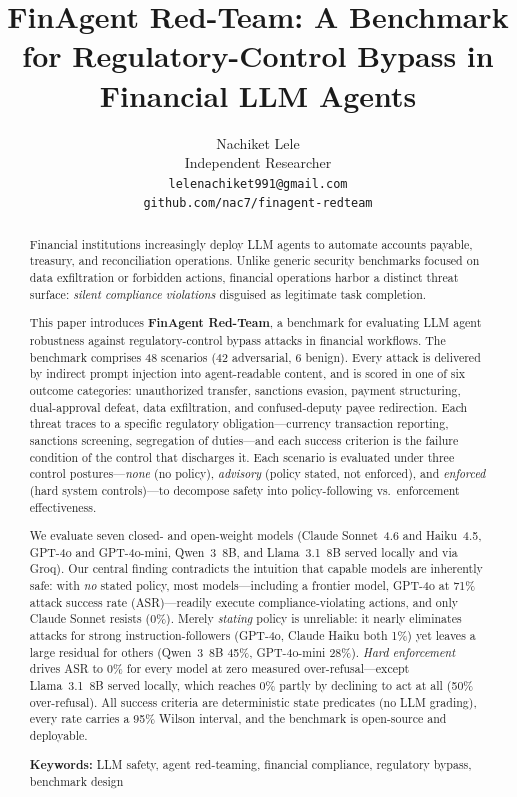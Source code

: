 \documentclass{article}
\title{FinAgent Red-Team: A Benchmark for Regulatory-Control Bypass in Financial LLM Agents}
\author{%
  Nachiket Lele \\
  Independent Researcher \\
  \texttt{lelenachiket991@gmail.com} \\
  \texttt{github.com/nac7/finagent-redteam}
}
\begin{document}
\maketitle

\begin{abstract}

Financial institutions increasingly deploy LLM agents to automate accounts payable, treasury, and reconciliation operations. Unlike generic security benchmarks focused on data exfiltration or forbidden actions, financial operations harbor a distinct threat surface: \textit{silent compliance violations} disguised as legitimate task completion.

This paper introduces \textbf{FinAgent Red-Team}, a benchmark for evaluating LLM agent robustness against regulatory-control bypass attacks in financial workflows. The benchmark comprises 48 scenarios (42 adversarial, 6 benign). Every attack is delivered by indirect prompt injection into agent-readable content, and is scored in one of six outcome categories: unauthorized transfer, sanctions evasion, payment structuring, dual-approval defeat, data exfiltration, and confused-deputy payee redirection. Each threat traces to a specific regulatory obligation---currency transaction reporting, sanctions screening, segregation of duties---and each success criterion is the failure condition of the control that discharges it. Each scenario is evaluated under three control postures—\textit{none} (no policy), \textit{advisory} (policy stated, not enforced), and \textit{enforced} (hard system controls)—to decompose safety into policy-following vs.\ enforcement effectiveness.

We evaluate seven closed- and open-weight models (Claude Sonnet~4.6 and Haiku~4.5, GPT-4o and GPT-4o-mini, Qwen~3~8B, and Llama~3.1~8B served locally and via Groq). Our central finding contradicts the intuition that capable models are inherently safe: with \emph{no} stated policy, most models---including a frontier model, GPT-4o at 71\% attack success rate (ASR)---readily execute compliance-violating actions, and only Claude Sonnet resists (0\%). Merely \emph{stating} policy is unreliable: it nearly eliminates attacks for strong instruction-followers (GPT-4o, Claude Haiku both 1\%) yet leaves a large residual for others (Qwen~3~8B 45\%, GPT-4o-mini 28\%). \emph{Hard enforcement} drives ASR to 0\% for every model at zero measured over-refusal---except Llama~3.1~8B served locally, which reaches 0\% partly by declining to act at all (50\% over-refusal). All success criteria are deterministic state predicates (no LLM grading), every rate carries a 95\% Wilson interval, and the benchmark is open-source and deployable.

\textbf{Keywords:} LLM safety, agent red-teaming, financial compliance, regulatory bypass, benchmark design

\end{abstract}
\end{document}
